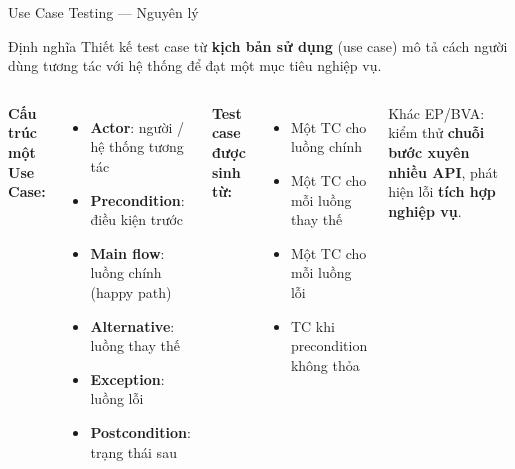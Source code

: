 \documentclass[aspectratio=169,12pt]{beamer}
\begin{document}
\begin{frame}[shrink=8]{Use Case Testing --- Nguyên lý}
  \begin{block}{Định nghĩa}
    Thiết kế test case từ \textbf{kịch bản sử dụng} (use case) mô tả cách
    người dùng tương tác với hệ thống để đạt một mục tiêu nghiệp vụ.
  \end{block}

  \vspace{0.15em}
  \small
  \begin{columns}[T,totalwidth=\textwidth]
    \textbf{Cấu trúc một Use Case:}
    \begin{itemize}
      \item \textbf{Actor}: người / hệ thống tương tác
      \item \textbf{Precondition}: điều kiện trước
      \item \textbf{Main flow}: luồng chính (happy path)
      \item \textbf{Alternative}: luồng thay thế
      \item \textbf{Exception}: luồng lỗi
      \item \textbf{Postcondition}: trạng thái sau
    \end{itemize}

    \textbf{Test case được sinh từ:}
    \begin{itemize}
      \item Một TC cho luồng chính
      \item Một TC cho mỗi luồng thay thế
      \item Một TC cho mỗi luồng lỗi
      \item TC khi precondition không thỏa
    \end{itemize}
    \vspace{0.2em}
    Khác EP/BVA: kiểm thử \textbf{chuỗi bước xuyên nhiều API},
    phát hiện lỗi \textbf{tích hợp nghiệp vụ}.
  \end{columns}
\end{frame}
\end{document}
